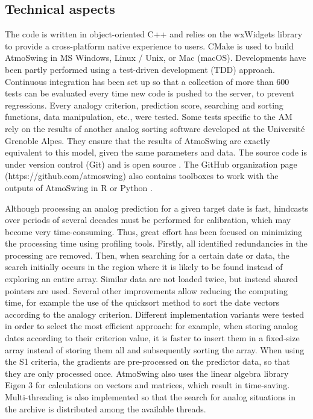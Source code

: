 \documentclass[review]{elsarticle}
\begin{document}
\subsection{Technical aspects}

The code is written in object-oriented C++ and relies on the wxWidgets \citep{Smart2006} library to provide a cross-platform native experience to users. CMake is used to build AtmoSwing in MS Windows, Linux / Unix, or Mac (macOS). Developments have been partly performed using a test-driven development (TDD) approach. Continuous integration has been set up so that a collection of more than 600 tests can be evaluated every time new code is pushed to the server, to prevent regressions. Every analogy criterion, prediction score, searching and sorting functions, data manipulation, etc., were tested. Some tests specific to the AM rely on the results of another analog sorting software developed at the Universit\'{e} Grenoble Alpes. They ensure that the results of AtmoSwing are exactly equivalent to this model, given the same parameters and data. The source code is under version control (Git) and is open source \citep[on GitHub, www.atmoswing.org,][]{Horton2018c}. The GitHub organization page (https://github.com/atmoswing) also contains toolboxes to work with the outputs of AtmoSwing in R \citep{Horton2018d} or Python \citep{Horton2018e}.

Although processing an analog prediction for a given target date is fast, hindcasts over periods of several decades must be performed for calibration, which may become very time-consuming. Thus, great effort has been focused on minimizing the processing time using profiling tools. Firstly, all identified redundancies in the processing are removed. Then, when searching for a certain date or data, the search initially occurs in the region where it is likely to be found instead of exploring an entire array. Similar data are not loaded twice, but instead shared pointers are used. Several other improvements allow reducing the computing time, for example the use of the quicksort method \citep{Hoare1962a} to sort the date vectors according to the analogy criterion. Different implementation variants were tested in order to select the most efficient approach: for example, when storing analog dates according to their criterion value, it is faster to insert them in a fixed-size array instead of storing them all and subsequently sorting the array. When using the S1 criteria, the gradients are pre-processed on the predictor data, so that they are only processed once. AtmoSwing also uses the linear algebra library Eigen 3 \citep{Guennebaud2010} for calculations on vectors and matrices, which result in time-saving. Multi-threading is also implemented so that the search for analog situations in the archive is distributed among the available threads. 
\end{document}
